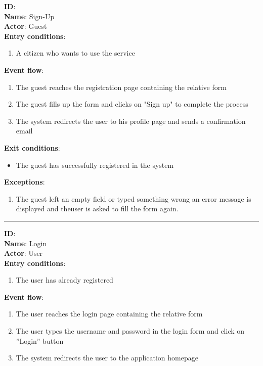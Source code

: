 
	\textbf{ID}:  \\
	\textbf{Name}: Sign-Up \\
	\textbf{Actor}: Guest \\
	\textbf{Entry conditions}:
	\begin{enumerate}
		\item{A citizen who wants to use the service}
	\end{enumerate}
	\textbf{Event flow}:
	\begin{enumerate}
		\item{The guest reaches the registration page containing the relative form}
		\item{The guest ﬁlls up the form and clicks on "Sign up" to complete the process}
		\item{The system redirects the user to his proﬁle page and sends a conﬁrmation email}
	\end{enumerate}
	\textbf{Exit conditions}:
	\begin{itemize}
		\item{The guest has successfully registered in the system}
	\end{itemize}
	\textbf{Exceptions}:
	\begin{enumerate}
    		\item{The guest left an empty ﬁeld or typed something wrong an error message is displayed and theuser is asked to ﬁll the form again.}
 	   \end{enumerate}
	\rule{\linewidth}{0.4pt}
	\textbf{ID}:  \\
	\textbf{Name}: Login \\
	\textbf{Actor}: User \\
	\textbf{Entry conditions}:
	\begin{enumerate}
		\item{The user has already registered}
	\end{enumerate}
	\textbf{Event flow}:
	\begin{enumerate}
		\item{The user reaches the login page containing the relative form}
		\item{The user types the username and password in the login form and click on ”Login” button}
		\item{The system redirects the user to the application homepage}
	\end{enumerate}
